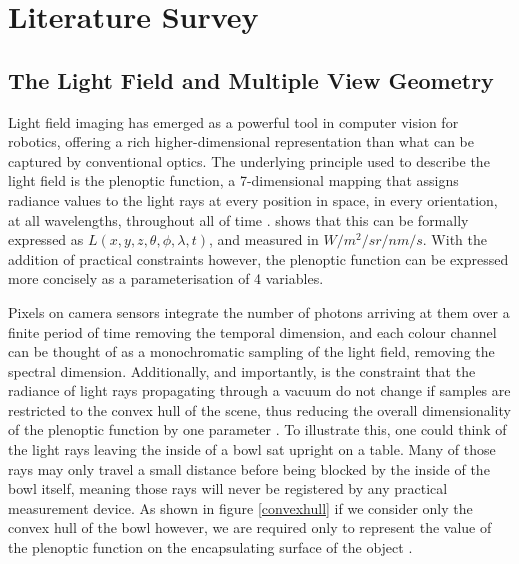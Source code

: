\documentclass[openany]{book}
\begin{document}
\chapter{Literature Survey}

\section{The Light Field and Multiple View Geometry}

Light field imaging has emerged as a powerful tool in computer vision for robotics, offering a rich higher-dimensional representation than what can be captured by conventional optics. The underlying principle used to describe the light field is the plenoptic function, a 7-dimensional mapping that assigns radiance values to the light rays at every position in space, in every orientation, at all wavelengths, throughout all of time \cite{ihrke2016lfprinciples}. \cite{adelson1991plenoptic} shows that this can be formally expressed as $L(x,y,z,\theta, \phi, \lambda, t)$, and measured in $W/m^2/sr/nm/s$. 
With the addition of practical constraints however, the plenoptic function can be expressed more concisely as a parameterisation of 4 variables. 

Pixels on camera sensors integrate the number of photons arriving at them over a finite period of time removing the temporal dimension, and each colour channel can be thought of as a monochromatic sampling of the light field, removing the spectral dimension. Additionally, and importantly, is the constraint that the radiance of light rays propagating through a vacuum do not change if samples are restricted to the convex hull of the scene, thus reducing the overall dimensionality of the plenoptic function by one parameter \cite{levoy1996lfrendering}. To illustrate this, one could think of the light rays leaving the inside of a bowl sat upright on a table. Many of those rays may only travel a small distance before being blocked by the inside of the bowl itself, meaning those rays will never be registered by any practical measurement device. As shown in figure \ref{convexhull} if we consider only the convex hull of the bowl however, we are required only to represent the value of the plenoptic function on the encapsulating surface of the object \cite{gortler1996lumigraph}.
\end{document}
